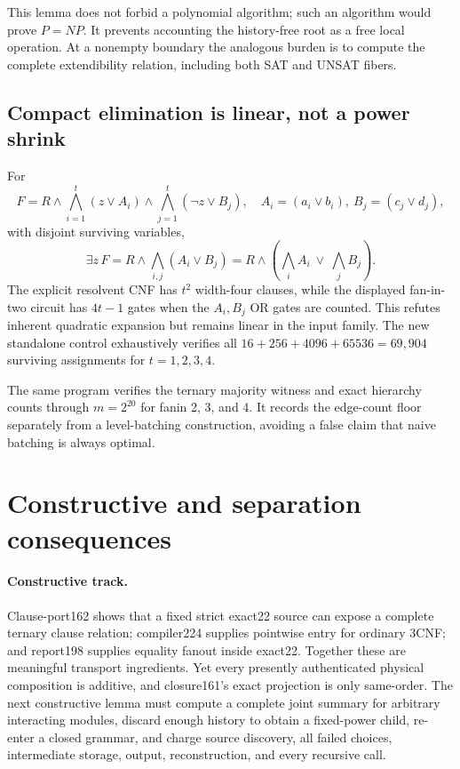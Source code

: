 \documentclass[11pt]{article}
\begin{document}
This lemma does not forbid a polynomial algorithm; such an algorithm would
prove $P=NP$.  It prevents accounting the history-free root as a free local
operation.  At a nonempty boundary the analogous burden is to compute the
complete extendibility relation, including both SAT and UNSAT fibers.

\subsection{Compact elimination is linear, not a power shrink}
For
\[
 F=R\land\bigwedge_{i=1}^{t}(z\lor A_i)
       \land\bigwedge_{j=1}^{t}(\neg z\lor B_j),
\quad A_i=(a_i\lor b_i),\ B_j=(c_j\lor d_j),
\]
with disjoint surviving variables,
\[
 \exists z\,F=R\land\bigwedge_{i,j}(A_i\lor B_j)
 =R\land\left(\bigwedge_iA_i\ \lor\ \bigwedge_jB_j\right).
\]
The explicit resolvent CNF has $t^2$ width-four clauses, while the displayed
fan-in-two circuit has $4t-1$ gates when the $A_i,B_j$ OR gates are counted.
This refutes inherent quadratic expansion but remains linear in the input
family.  The new standalone control exhaustively verifies all
$16+256+4096+65536=69{,}904$ surviving assignments for $t=1,2,3,4$.

The same program verifies the ternary majority witness and exact hierarchy
counts through $m=2^{20}$ for fanin 2, 3, and 4.  It records the edge-count
floor separately from a level-batching construction, avoiding a false claim
that naive batching is always optimal.

\section{Constructive and separation consequences}
\paragraph{Constructive track.}
Clause-port162 shows that a fixed strict exact22 source can expose a complete
ternary clause relation; compiler224 supplies pointwise entry for ordinary
3CNF; and report198 supplies equality fanout inside exact22.  Together these
are meaningful transport ingredients.  Yet every presently authenticated
physical composition is additive, and closure161's exact projection is only
same-order.  The next constructive lemma must compute a complete joint
summary for arbitrary interacting modules, discard enough history to obtain
a fixed-power child, re-enter a closed grammar, and charge source discovery,
all failed choices, intermediate storage, output, reconstruction, and every
recursive call.
\end{document}

